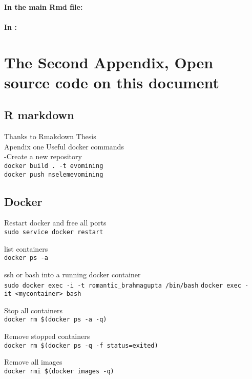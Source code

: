 \documentclass[]{article}
\let\oldparagraph\paragraph
\renewcommand{\paragraph}[1]{\oldparagraph{#1}\mbox{}}
\begin{document}
\paragraph{In the main Rmd file:}\label{in-the-main-rmd-file}

\paragraph{\texorpdfstring{In
\protect\hyperlink{ref_labels}{}:}{In :}}\label{in}

\section{The Second Appendix, Open source code on this
document}\label{the-second-appendix-open-source-code-on-this-document}

\subsection{R markdown}\label{r-markdown}

Thanks to Rmakdown Thesis\\
Apendix one Useful docker commands\\
-Create a new repository\\
\texttt{docker\ build\ .\ -t\ evomining}\\
\texttt{docker\ push\ nselemevomining}

\subsection{Docker}\label{docker}

Restart docker and free all ports\\
\texttt{sudo\ service\ docker\ restart}

list containers\\
\texttt{docker\ ps\ -a}

ssh or bash into a running docker container\\
\texttt{sudo\ docker\ exec\ -i\ -t\ romantic\_brahmagupta\ /bin/bash}
\texttt{docker\ exec\ -it\ \textless{}mycontainer\textgreater{}\ bash}

Stop all containers\\
\texttt{docker\ rm\ \$(docker\ ps\ -a\ -q)}

Remove stopped containers\\
\texttt{docker\ rm\ \$(docker\ ps\ -q\ -f\ status=exited)}

Remove all images\\
\texttt{docker\ rmi\ \$(docker\ images\ -q)}
\end{document}
